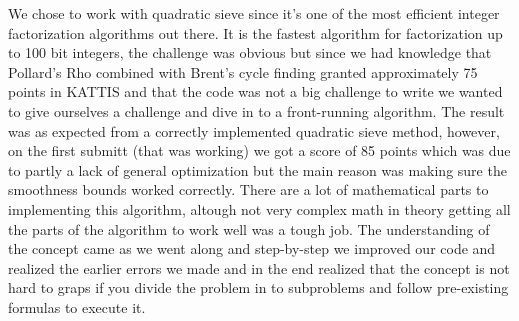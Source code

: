 We chose to work with quadratic sieve since it's one of the most efficient integer factorization algorithms out there. It is the fastest algorithm for factorization up to 100 bit integers, the challenge was obvious but since we had knowledge that Pollard's Rho combined with Brent's cycle finding granted approximately 75 points in KATTIS and that the code was not a big challenge to write we wanted to give ourselves a challenge and dive in to a front-running algorithm.
The result was as expected from a correctly implemented quadratic sieve method, however, on the first submitt (that was working) we got a score of 85 points which was due to partly a lack of general optimization but the main reason was making sure the smoothness bounds worked correctly. There are a lot of mathematical parts to implementing this algorithm, altough not very complex math in theory getting all the parts of the algorithm to work well was a tough job. The understanding of the concept came as we went along and step-by-step we improved our code and realized the earlier errors we made and in the end realized that the concept is not hard to graps if you divide the problem in to subproblems and follow pre-existing formulas to execute it.